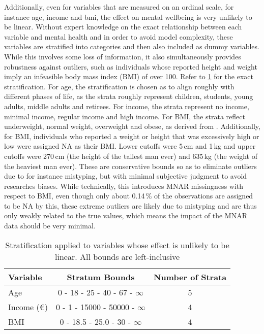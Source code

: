 Additionally, even for variables that are measured on an ordinal scale, for instance age, income and bmi, the effect on mental wellbeing is very unlikely to
be linear. Without expert knowledge on the exact relationship between each variable
and mental health and in order to avoid model complexity, these variables are stratified into categories and then also
included as dummy variables. While this involves some loss of information, it also simultaneously provides robustness
against outliers, such as individuals whose reported height and weight imply an infeasible body mass index (BMI) of over 100.
Refer to \cref{tab:data:stratification} for the exact stratification.
For age, the stratification is chosen as to align roughly with different phases of life, as the strata roughly represent
children, students, young adults, middle adults and retirees.
For income, the strata represent no income, minimal income, regular income and high income.
For BMI, the strata reflect underweight, normal weight, overweight and obese, as derived from .
Additionally, for BMI, individuals who reported a weight or height that was excessively high or low were assigned NA as their BMI.
Lower cutoffs were 5\,cm and 1\,kg and upper cutoffs were 270\,cm (the height of the tallest man ever) and 635\,kg
(the weight of the heaviest man ever). These are conservative bounds so as to eliminate outliers due to for instance
mistyping, but with minimal subjective judgment to avoid researches biases.
While technically, this introduces MNAR missingness with respect to BMI, even though only about 0.14\,\% of the observations are
assigned to be NA by this, these extreme outliers are likely due to mistyping and are thus only weakly related to the
true values, which means the impact of the MNAR data should be very minimal.

\begin{table}[htbp]
    \centering
    \caption{Stratification applied to variables whose effect is unlikely to be linear. All bounds are left-inclusive}
    \label{tab:data:stratification}
    \begin{tabular}{l|c|c}
        Variable & Stratum Bounds & Number of Strata \\
        \hline
        Age        & 0 \hfill- \hfill18 \hfill- \hfill25 \hfill- \hfill40 \hfill- \hfill67 \hfill- \hfill$ \infty$ & 5  \\
        Income (€) & 0 \hfill- \hfill1 \hfill- \hfill15000 \hfill- \hfill50000 \hfill- \hfill$ \infty$ & 4  \\
        BMI        & 0 \hfill- \hfill18.5 \hfill- \hfill25.0 \hfill- \hfill30 \hfill- \hfill$ \infty$  & 4  \\
    \end{tabular}
\end{table}

